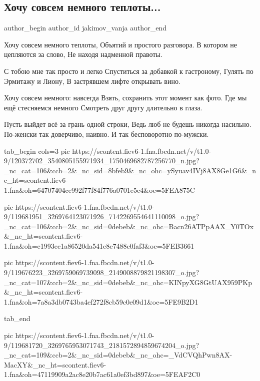  
 
 
 
 
 
\subsection{Хочу совсем немного теплоты...}
\label{sec:30_09_2020.fb.jakimov_vanja.1.hochu_sovsem_nemnogo_teploty}
\ifcmt
	author_begin
   author_id jakimov_vanja
	author_end
\fi

\begin{multicols}{2}
	\obeycr
	Хочу совсем немного теплоты,
Объятий и простого разговора.
В котором не цепляются за слово,
Не находя надменной правоты.

С тобою мне так просто и легко
Спуститься за добавкой к гастроному,
Гулять по Эрмитажу и Лиону, 
В застрявшем лифте открывать вино.

Хочу совсем немного: навсегда
Взять, сохранить этот момент как фото.
Где мы ещё стесняемся немного
Смотреть друг другу длительно в глаза.

Пусть выйдет всё за грань одной строки, 
Ведь люб не будешь никогда насильно.
По-женски так доверчиво, наивно.
И так бесповоротно по-мужски.
	\restorecr
\end{multicols}

\ifcmt
tab_begin cols=3
pic https://scontent.fiev6-1.fna.fbcdn.net/v/t1.0-9/120372702_3540805155971934_1750469682787256770_n.jpg?_nc_cat=106&ccb=2&_nc_sid=8bfeb9&_nc_ohc=ySyuav4IVj8AX8Ge1G6&_nc_ht=scontent.fiev6-1.fna&oh=64707404ce992f77f84f776a0701e5c4&oe=5FEA875C

pic https://scontent.fiev6-1.fna.fbcdn.net/v/t1.0-9/119681951_3269764123071926_7142269554641110098_o.jpg?_nc_cat=106&ccb=2&_nc_sid=0debeb&_nc_ohc=Bacn26ATPpAAX_Y0TOx&_nc_ht=scontent.fiev6-1.fna&oh=e1993ec1a86520da541e8e7488c0faf3&oe=5FEB3661

pic https://scontent.fiev6-1.fna.fbcdn.net/v/t1.0-9/119676223_3269759069739098_2149008879821198307_o.jpg?_nc_cat=107&ccb=2&_nc_sid=0debeb&_nc_ohc=KINpyXG8GtUAX959PKp&_nc_ht=scontent.fiev6-1.fna&oh=7a8a3db0743ba4ef272f8cb59c0e09d1&oe=5FE9B2D1

tab_end
\fi

\ifcmt
pic https://scontent.fiev6-1.fna.fbcdn.net/v/t1.0-9/119681720_3269765953071743_2181572894859674204_o.jpg?_nc_cat=109&ccb=2&_nc_sid=0debeb&_nc_ohc=_VdCVQhPwn8AX-MacXY&_nc_ht=scontent.fiev6-1.fna&oh=47119909a2ac8e20b7ac61a0ef3bd897&oe=5FEAF2C0
\fi

